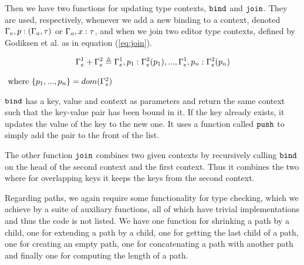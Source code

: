 Then we have two functions for updating type contexts, $\texttt{bind}$ and
$\texttt{join}$. They are used, respectively, whenever we add a new binding to a
context, denoted $\Gamma_{e},p : (\Gamma_{a},\tau)$ or
$\Gamma_{a},x : \tau$, and when we join two editor type contexts, defined by
Godiksen et al. as in equation (\ref{eq:join}).\pepm

\begin{equation}\label{eq:join}
  \Gamma_{e}^1 + \Gamma_{e}^2 \triangleq \Gamma_{e}^1,p_1 : \Gamma_{e}^2(p_1),...,\Gamma_{e}^1,p_n : \Gamma_{e}^2(p_n)
\end{equation}
\begin{center}
  $\text{ where } \{p_1,...,p_n\} = dom(\Gamma_{e}^2)$~~~~~~~~~~~~~~~~~~~~~~~~~~
\end{center}

$\texttt{bind}$ has a key, value and context as parameters and return the same
context such that the key-value pair has been bound in it. If the key already
exists, it updates the value of the key to the new one. It uses a function
called $\texttt{push}$ to simply add the pair to the front of the list.

The other function $\texttt{join}$ combines two given contexts by recursively
calling $\texttt{bind}$ on the head of the second context and the first context.
Thus it combines the two where for overlapping keys it keeps the keys from the
second context. 

Regarding paths, we again require some functionality for type checking, which
we achieve by a suite of auxiliary functions, all of which have trivial
implementations and thus the code is not listed. We have one function for
shrinking a path by a child, one for extending a path by a child, one for
getting the last child of a path, one for creating an empty path, one for
concatenating a path with another path and finally one for computing the length
of a path.

